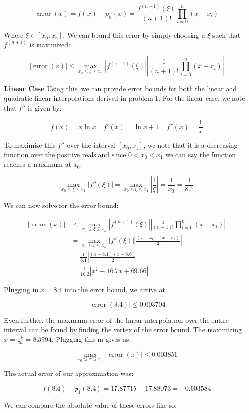 \documentclass{article}
\begin{document}
$$\operatorname{error}(x)=f(x)-p_n(x)=\frac{f^{(n+1)}(\xi)}{(n+1)!} \prod_{i=0}^n (x-x_i)$$

Where $\xi\in[x_0,x_n]$. We can bound this error by simply choosing a $\xi$ such that $f^{(n+1)}$ is maximized:

$$|\operatorname{error}(x)| \le \max_{x_0\le\xi\le x_n}\left|f^{(n+1)}(\xi)\right|\left|\frac{1}{(n+1)!} \prod_{i=0}^n (x-x_i)\right|$$

\textbf{Linear Case}
Using this, we can provide error bounds for both the linear and quadratic linear interpolations derived in problem 1. For the linear case, we note that $f''$ is given by:

$$f(x)=x\ln x\ \ \ \ \ f'(x)=\ln x+1\ \ \ \ \ f''(x)=\frac{1}{x}$$

To maximize this $f''$ over the interval $[x_0,x_1]$, we note that it is a decreasing function over the positive reals and since $0<x_0<x_1$ we can say the function reaches a maximum at $x_0$:

$$\max_{x_0\le\xi\le x_1}\left|f''(\xi)\right|=\max_{x_0\le\xi\le x_1}\left|\frac{1}{\xi}\right|=\frac{1}{x_0}=\frac{1}{8.1}$$

We can now solve for the error bound:

\begin{align*}
  |\operatorname{error}(x)|
  &\le\max_{x_0\le\xi\le x_n}\left|f^{(n+1)}(\xi)\right|\left|\frac{1}{(n+1)!} \prod_{i=0}^n (x-x_i)\right|\\
  &=\max_{x_0\le\xi\le x_n}\left|f''(\xi)\right|\left|\frac{(x-x_0)(x-x_1)}{2}\right|\\
  &=\frac{1}{8.1}\left|\frac{(x-8.1)(x-8.6)}{2}\right|\\
  &=\frac{1}{16.2}|x^2-16.7x+69.66|
\end{align*}

Plugging in $x=8.4$ into the error bound, we arrive at:

$$|\operatorname{error}(8.4)|\le\boxed{0.003704}$$

Even further, the maximum error of the linear interpolation over the entire interval can be found by finding the vertex of the error bound. The maximizing $x=\frac{-b}{2a}=8.3994$. Plugging this in gives us:

$$\max_{x_0\le x\le x_n}|\operatorname{error}(x)|\le0.003851$$

The actual error of our approximation was:

$$f(8.4)-p_1(8.4)=17.87715-17.88073=-0.003584$$

We can compare the absolute value of these errors like so:
\end{document}
